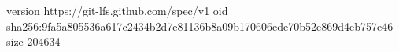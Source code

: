 version https://git-lfs.github.com/spec/v1
oid sha256:9fa5a805536a617c2434b2d7e81136b8a09b170606ede70b52e869d4eb757e46
size 204634
